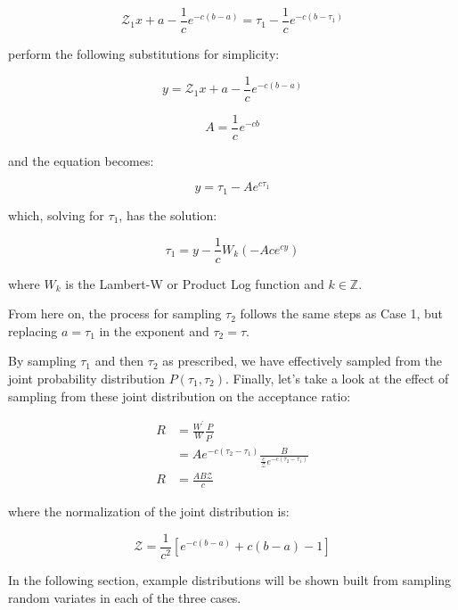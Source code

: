 \documentclass[12pt, two sided]{article}
\begin{document}
\begin{equation}
\mathcal{Z}_1 x + a - \frac{1}{c} e^{-c(b-a)} = \tau_1 - \frac{1}{c} e^{-c(b-\tau_1)}
\end{equation}

perform the following substitutions for simplicity:

\begin{equation}
y = \mathcal{Z}_1 x + a - \frac{1}{c} e^{-c(b-a)}
\end{equation}

\begin{equation}
A = \frac{1}{c} e^{-cb}
\end{equation}

and the equation becomes:

\begin{equation}
y = \tau_1 - A e^{c \tau_1}
\end{equation}

which, solving for $\tau_1$, has the solution:

\begin{equation}
\tau_1 = y - \frac{1}{c} W_{k}(-Ac e^{cy})
\end{equation}

where $W_{k}$ is the Lambert-W or Product Log function and $k\in\mathbb{Z}$. 

From here on, the process for sampling $\tau_2$ follows the same steps as Case 1, but replacing $a=\tau_1$ in the exponent and $\tau_2=\tau$.

By sampling $\tau_1$ and then $\tau_2$ as prescribed, we have effectively sampled from the joint probability distribution $P(\tau_1,\tau_2)$. Finally, let's take a look at the effect of sampling from these joint distribution on the acceptance ratio:

\begin{align}
R &= \frac{W^\prime}{W} \frac{P}{P^\prime} \\
&= A e^{-c(\tau_2-\tau_1)} \frac{B}{\frac{c}{\mathcal{Z}}e^{-c(\tau_2-\tau_1)}} \\
R &= \frac{A B \mathcal{Z}}{c} 
\end{align}

where the normalization of the joint distribution is:

\begin{equation}
\mathcal{Z} = \frac{1}{c^2} [e^{-c(b-a)}+c(b-a)-1]
\end{equation}

In the following section, example distributions will be shown built from sampling random variates in each of the three cases.
\end{document}
